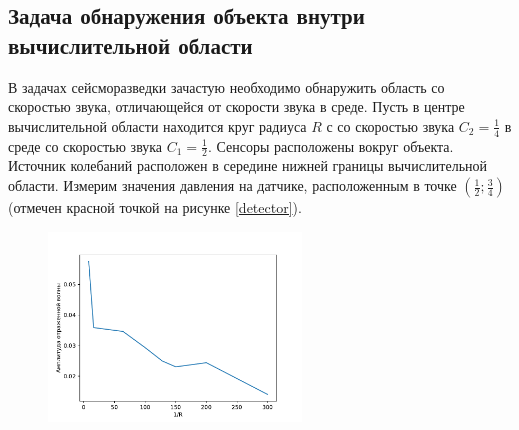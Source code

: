 \documentclass[a4paper, fontsize=14pt]{article}
\begin{document}
\subsection{Задача обнаружения объекта внутри вычислительной области}
В задачах сейсморазведки зачастую необходимо обнаружить область со скоростью звука, отличающейся от
скорости звука в среде. Пусть в центре вычислительной области находится круг радиуса $R$ с со
скоростью звука $C_2 = \frac{1}{4}$ в среде со скоростью звука $C_1 = \frac{1}{2}$. Сенсоры
расположены вокруг объекта. Источник колебаний расположен в середине нижней границы вычислительной области.
Измерим значения давления на датчике, расположенным в точке $\left(\frac{1}{2};\frac{3}{4}\right)$
(отмечен красной точкой на рисунке \ref{detector}).
\begin{figure}[h]
    \centering
    \includegraphics[width=0.6\textwidth]{refl_amp_inv.pdf}
    \caption{}
    \label{reflampinv}
\end{figure}
\end{document}
